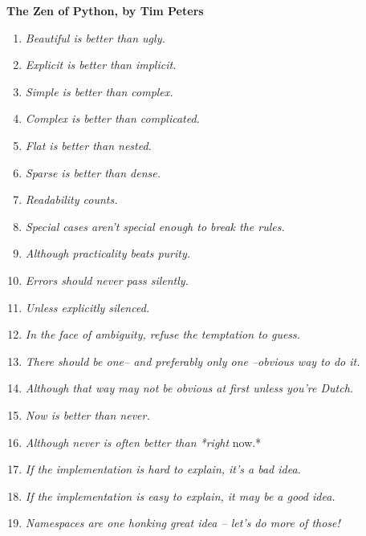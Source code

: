 \documentclass[letterpaper,10pt,english]{manual}
\begin{document}
\textbf{The Zen of Python, by Tim Peters}
\begin{enumerate}
\item {} 
\emph{Beautiful is better than ugly.}

\item {} 
\emph{Explicit is better than implicit.}

\item {} 
\emph{Simple is better than complex.}

\item {} 
\emph{Complex is better than complicated.}

\item {} 
\emph{Flat is better than nested.}

\item {} 
\emph{Sparse is better than dense.}

\item {} 
\emph{Readability counts.}

\item {} 
\emph{Special cases aren't special enough to break the rules.}

\item {} 
\emph{Although practicality beats purity.}

\item {} 
\emph{Errors should never pass silently.}

\item {} 
\emph{Unless explicitly silenced.}

\item {} 
\emph{In the face of ambiguity, refuse the temptation to guess.}

\item {} 
\emph{There should be one-- and preferably only one --obvious way to do it.}

\item {} 
\emph{Although that way may not be obvious at first unless you're Dutch.}

\item {} 
\emph{Now is better than never.}

\item {} 
\emph{Although never is often better than *right} now.*

\item {} 
\emph{If the implementation is hard to explain, it's a bad idea.}

\item {} 
\emph{If the implementation is easy to explain, it may be a good idea.}

\item {} 
\emph{Namespaces are one honking great idea -- let's do more of those!}

\end{enumerate}
\end{document}
